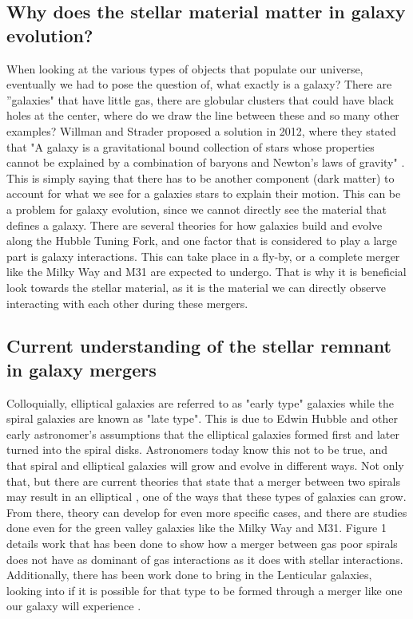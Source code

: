 \documentclass{aastex63}
\begin{document}
\subsection{Why does the stellar material matter in galaxy evolution?}
When looking at the various types of objects that populate our universe, eventually we had to pose the question of, what exactly is a galaxy? There are ''galaxies" that have little gas, there are globular clusters that could have black holes at the center, where do we draw the line between these and so many other examples? Willman and Strader proposed a solution in 2012, where they stated that "A galaxy is a gravitational bound collection of stars whose properties cannot be explained by a combination of baryons and Newton's laws of gravity" \citep{2012AJ....144...76W}. This is simply saying that there has to be another component (dark matter) to account for what we see for a galaxies stars to explain their motion. This can be a problem for galaxy evolution, since we cannot directly see the material that defines a galaxy. There are several theories for how galaxies build and evolve along the Hubble Tuning Fork, and one factor that is considered to play a large part is galaxy interactions. This can take place in a fly-by, or a complete merger like the Milky Way and M31 are expected to undergo. That is why it is beneficial look towards the stellar material, as it is the material we can directly observe interacting with each other during these mergers.


\subsection{Current understanding of the stellar remnant in galaxy mergers}
Colloquially, elliptical galaxies are referred to as "early type" galaxies while the spiral galaxies are known as "late type". This is due to Edwin Hubble and other early astronomer's assumptions that the elliptical galaxies formed first and later turned into the spiral disks. Astronomers today know this not to be true, and that spiral and elliptical galaxies will grow and evolve in different ways. Not only that, but there are current theories that state that a merger between two spirals may result in an elliptical \citep{1992ARA&A..30..705B}, one of the ways that these types of galaxies can grow. From there, theory can develop for even more specific cases, and there are studies done even for the green valley galaxies like the Milky Way and M31. Figure 1 details work that has been done to show how a merger between gas poor spirals does not have as dominant of gas interactions as it does with stellar interactions. Additionally, there has been work done to bring in the Lenticular galaxies, looking into if it is possible for that type to be formed through a merger like one our galaxy will experience \citep{2020MNRAS.492.2955C}. 
\end{document}
